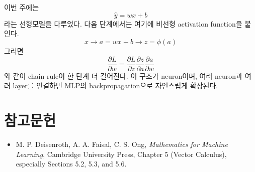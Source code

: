 \documentclass[11pt,a4paper]{article}
\begin{document}
이번 주에는
\[
\widehat y=wx+b
\]
라는 선형모델을 다루었다. 다음 단계에서는 여기에 비선형 activation function을 붙인다.
\[
\boxed{
 x
\longrightarrow
 a=wx+b
\longrightarrow
 z=\phi(a)
}
\]
그러면
\[
\frac{\partial L}{\partial w}
=
\frac{\partial L}{\partial z}
\frac{\partial z}{\partial a}
\frac{\partial a}{\partial w}
\]
와 같이 chain rule이 한 단계 더 길어진다.
이 구조가 neuron이며, 여러 neuron과 여러 layer를 연결하면 MLP의 backpropagation으로 자연스럽게 확장된다.

\section*{참고문헌}
\begin{itemize}
\item M. P. Deisenroth, A. A. Faisal, C. S. Ong, \emph{Mathematics for Machine Learning}, Cambridge University Press, Chapter 5 (Vector Calculus), especially Sections 5.2, 5.3, and 5.6.
\end{itemize}
\end{document}
